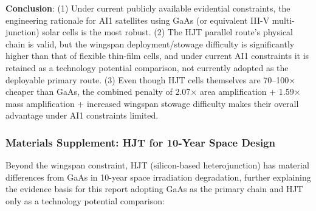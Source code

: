 \textbf{Conclusion}: (1) Under current publicly available evidential constraints, the engineering rationale for AI1 satellites using GaAs (or equivalent III-V multi-junction) solar cells is the most robust. (2) The HJT parallel route's physical chain is valid, but the wingspan deployment/stowage difficulty is significantly higher than that of flexible thin-film cells, and under current AI1 constraints it is retained as a technology potential comparison, not currently adopted as the deployable primary route. (3) Even though HJT cells themselves are 70--100$\times$ cheaper than GaAs, the combined penalty of 2.07$\times$ area amplification + 1.59$\times$ mass amplification + increased wingspan stowage difficulty makes their overall advantage under AI1 constraints limited.

\subsubsection{Materials Supplement: HJT for 10-Year Space Design}

Beyond the wingspan constraint, HJT (silicon-based heterojunction) has material differences from GaAs in 10-year space irradiation degradation, further explaining the evidence basis for this report adopting GaAs as the primary chain and HJT only as a technology potential comparison:

